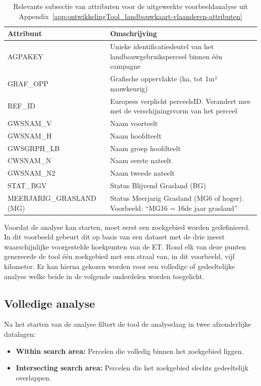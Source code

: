 \begin{table}[htbp]
    \centering
    \caption{Relevante subsectie van attributen voor de uitgewerkte voorbeeldanalyse uit Appendix~\ref{app:ontwikkelingTool_landbouwkaart-vlaanderen-attributen}}\label{tab:ontwikkeling-tool_landb-VL-att-subsec}
    \footnotesize
    \begin{tabularx}{\textwidth}{@{} >{\raggedright\arraybackslash}l >{\raggedright\arraybackslash}X @{}}
        \toprule
        \textbf{Attribuut} & \textbf{Omschrijving} \\
        \midrule
        AGPAKEY & Unieke identificatiesleutel van het landbouwgebruiksperceel binnen één campagne \\
        GRAF\_OPP & Grafische oppervlakte (ha, tot 1m² nauwkeurig) \\
        REF\_ID & Europees verplicht perceelsID. Verandert mee met de verschijningsvorm van het perceel \\
        GWSNAM\_V & Naam voorteelt \\
        GWSNAM\_H & Naam hoofdteelt \\
        GWSGRPH\_LB & Naam groep hoofdteelt \\
        CWSNAM\_N & Naam eerste nateelt \\
        GWSNAM\_N2 & Naam tweede nateelt \\
        STAT\_BGV & Status Blijvend Grasland (BG) \\
        MEERJARIG\_GRASLAND (MG) & Status Meerjarig Grasland (MG6 of hoger). Voorbeeld: “MG16 = 16de jaar grasland” \\
        \bottomrule
    \end{tabularx}
\end{table}

Voordat de analyse kan starten, moet eerst een zoekgebied worden gedefinieerd.
In dit voorbeeld gebeurt dit op basis van een dataset met de drie meest waarschijnlijke voorgestelde hoekpunten van de ET.\@
Rond elk van deze punten genereerde de tool één zoekgebied met een straal van, in dit voorbeeld, vijf kilometer.
Er kan hierna gekozen worden voor een volledige of gedeeltelijke analyse welke beide in de volgende onderdelen worden toegelicht.

\subsection{Volledige analyse}\label{subsec:volledige-analyse}
Na het starten van de analyse filtert de tool de analyselaag in twee afzonderlijke datalagen:
\begin{itemize}
    \item \textbf{Within search area:} Percelen die volledig binnen het zoekgebied liggen.
    \item \textbf{Intersecting search area:} Percelen die het zoekgebied slechts gedeeltelijk overlappen.
\end{itemize} 

